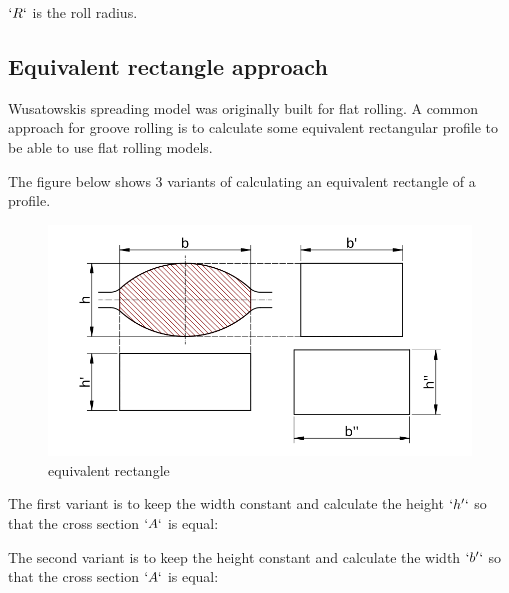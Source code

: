 \(`R`\) is the roll radius.

\hypertarget{equivalent-rectangle-approach}{%
\subsection{Equivalent rectangle
approach}\label{equivalent-rectangle-approach}}

Wusatowskis spreading model was originally built for flat rolling. A
common approach for groove rolling is to calculate some equivalent
rectangular profile to be able to use flat rolling models.

The figure below shows 3 variants of calculating an equivalent rectangle
of a profile.

\begin{figure}
\centering
\includegraphics{equivalent_rectangle.svg}
\caption{equivalent rectangle}
\end{figure}

The first variant is to keep the width constant and calculate the height
\(`h'`\) so that the cross section \(`A`\) is equal:

\begin{Shaded}
\begin{Highlighting}[]
\end{Highlighting}
\end{Shaded}

The second variant is to keep the height constant and calculate the
width \(`b'`\) so that the cross section \(`A`\) is equal:

\begin{Shaded}
\begin{Highlighting}[]
\end{Highlighting}
\end{Shaded}

